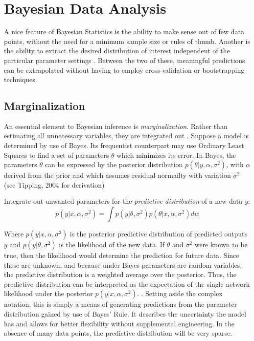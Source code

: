 \section{Bayesian Data Analysis} %


A nice feature of Bayesian Statistics is the ability to make sense out of few data points, without the need for a minimum sample size or rules of thumb.  Another is the ability to extract the desired distribution of interest independent of the particular parameter settings \cite{bishop2006pattern}.  Between the two of these, meaningful predictions can be extrapolated without having to employ cross-validation or bootstrapping techniques.

\subsection{Marginalization}

An essential element to Bayesian inference is \textit{marginalization}.  Rather than estimating all unnecessary variables, they are integrated out
\cite{tipping2004bayesian}.  Suppose a model is determined by use of Bayes.  Its frequentist counterpart may use Ordinary Least Squares to find a set of parameters $\theta$ which minimizes its error. In Bayes, the parameters $\theta$ can be expressed by the posterior distribution $p(\theta|y,\alpha,\sigma^2)$, with $\alpha$ derived from the prior and which assumes residual normailty with variation $\sigma^2$ (see Tipping, 2004 \cite{tipping2004bayesian} for derivation)

Integrate out unwanted parameters for the \textit{predictive distribution} of a new data $y$:
$$
p(y|x,\alpha,\sigma^2) = \int p(y|\theta,\sigma^2) p(\theta|x,\alpha,\sigma^2) dw
$$

Where  $p(y|x,\alpha,\sigma^2)$ is the posterior predictive distribution of predicted outputs $y$ and $p(y|\theta,\sigma^2)$ is the likelihood of the new data.  If $\theta$ and $\sigma^2$ were known to be true, then the likelihood would determine the prediction for future data.  Since these are unknown, and because under Bayes parameters are random variables, the predictive distribution is a weighted average over the posterior.  Thus, the  predictive distribution can be interpreted as the expectation of the single network likelihood under the posterior $p(y|x,\alpha,\sigma^2)$. \cite{salad} \cite{Jospin}.  
Setting aside the complex notation, this is simply a means of generating predictions from the parameter distribution gained by use of Bayes' Rule.  It describes the uncertainty the model has and allows for better flexibility without supplemental engineering.
In the absence of many data points, the predictive distribution will be very sparse. \cite{tipping2004bayesian}

